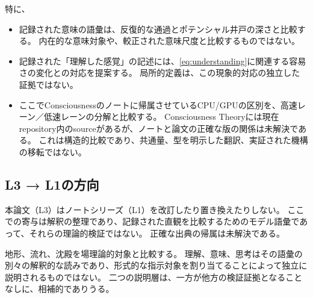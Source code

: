 特に、
\begin{itemize}
\item 記録された意味の語彙は、反復的な通過とポテンシャル井戸の深さと比較する。
内在的な意味対象や、較正された意味尺度と比較するものではない。
\item 記録された「理解した感覚」の記述には、\eqref{eq:understanding}に関連する容易さの変化との対応を提案する。
局所的定義は、この現象的対応の独立した証拠ではない。
\item ここでConsciousnessのノートに帰属させているCPU/GPUの区別を、高速レーン／低速レーンの分解と比較する。
Consciousness Theoryには現在repository内のsourceがあるが、ノートと論文の正確な版の関係は未解決である。
これは構造的比較であり、共通量、型を明示した翻訳、実証された機構の移転ではない。
\end{itemize}

\subsection{L3 → L1の方向}
本論文（L3）はノートシリーズ（L1）を改訂したり置き換えたりしない。
ここでの寄与は解釈の整理であり、記録された直観を比較するためのモデル語彙であって、それらの理論的検証ではない。
正確な出典の帰属は未解決である。

地形、流れ、沈殿を場理論的対象と比較する。
理解、意味、思考はその語彙の別々の解釈的な読みであり、形式的な指示対象を割り当てることによって独立に説明されるものではない。
二つの説明層は、一方が他方の検証証拠となることなしに、相補的でありうる。
